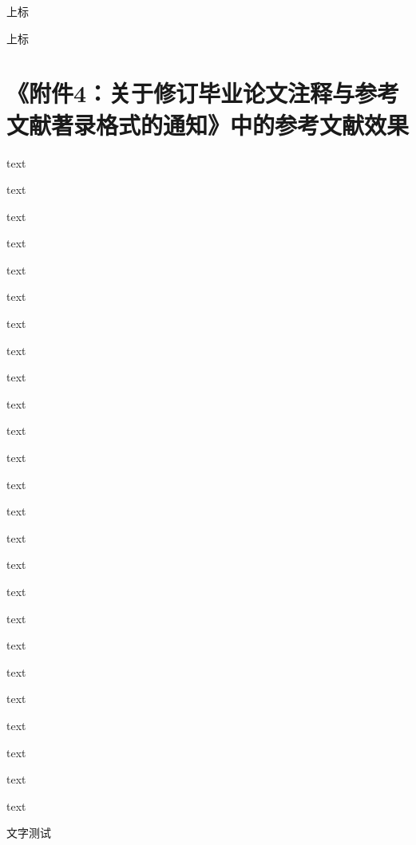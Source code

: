 上标\cite[test]{zurek2014quantum}

上标\cite{zurek2014quantum}



\section{《附件4：关于修订毕业论文注释与参考文献著录格式的通知》中的参考文献效果}

  text\parencite{李晓东rawtype}

  text\parencite{Ahnrawtype}

  text\parencite{Ahnrawtype}

  text\parencite{丁文祥rawtype}

  text\parencite{邱泽奇会议论文集rawtype}

  text\parencite{雷光春rawtype}

  text\parencite{zhangrawtype}

  text\parencite{邱泽奇会议论文rawtype}

  text\parencite{马克思rawtype}

  text\parencite{昂温rawtype}

  text\parencite{Fothrawtype}

  text\parencite{杨国枢rawtype}

  text\parencite{Morisonrawtype}

  text\parencite{张志祥rawtype}

  text\parencite{徐秀英rawtype}

  text\parencite{Aldemitarawtype}

  text\parencite{张凯军rawtype}

  text\parencite{Kosekrawtype}

  text\parencite{文献编写rawtype}

  text\parencite{国防白皮rawtype}

  text\parencite{federalrawtype}

  text\parencite{healthrawtype}

  text\parencite{江向东rawtype}

  text\parencite{萧钮rawtype}

  text\parencite{Dublinrawtype}

文字测试